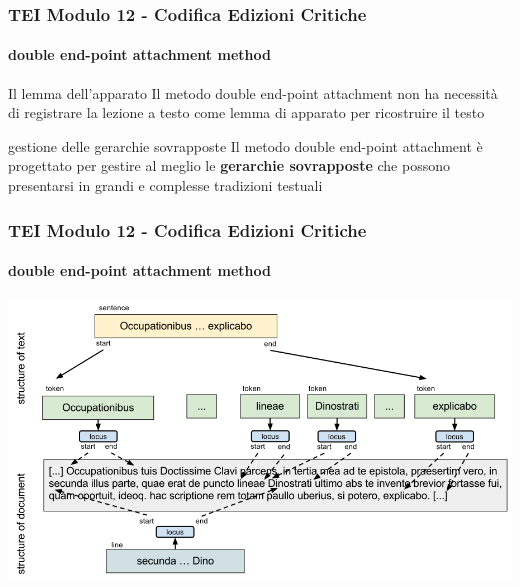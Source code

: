 \begin{frame}
    \frametitle{TEI Modulo 12 - Codifica Edizioni Critiche}
    \framesubtitle{double end-point attachment method}
    \addtocounter{nframe}{1}







    \begin{block}{Il lemma dell'apparato}
        Il metodo double end-point attachment non ha necessità di registrare la lezione a testo come lemma di apparato per ricostruire il testo
    \end{block}
    
    \begin{block}{gestione delle gerarchie sovrapposte}
       Il metodo double end-point attachment è progettato per gestire al meglio le \textbf{gerarchie sovrapposte} che possono presentarsi in grandi e complesse tradizioni testuali
    \end{block}

\end{frame}


\begin{frame}
    \frametitle{TEI Modulo 12 - Codifica Edizioni Critiche}
    \framesubtitle{double end-point attachment method}
    \addtocounter{nframe}{1}
    
   
    \begin{center}
       \includegraphics[width=.95\textwidth]{imgs/Clavius-DH.png}
    \end{center}

\end{frame}


